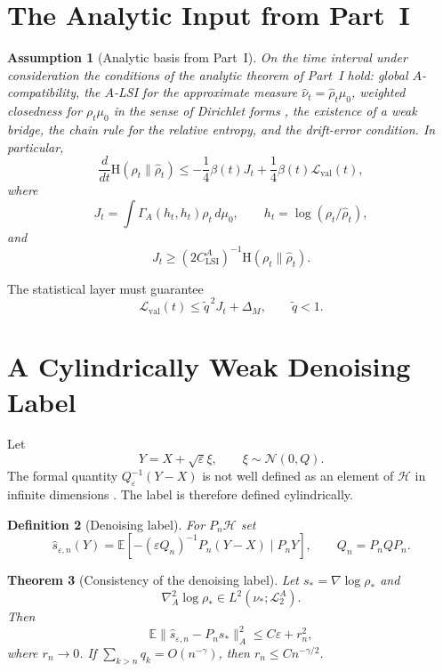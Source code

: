\documentclass{article}
\newtheorem{theorem}{Theorem}[section]
\newtheorem{assumption}[theorem]{Assumption}
\newtheorem{definition}[theorem]{Definition}
\newcommand{\Hh}{\mathcal H}
\newcommand{\LLtwo}{\mathcal L_2}
\newcommand{\E}{\mathbb E}
\newcommand{\Ent}{\mathrm H}
\newcommand{\Eval}{\mathcal L_{\mathrm{val}}}
\begin{document}
\section{The Analytic Input from Part~I}

\begin{assumption}[Analytic basis from Part~I]
\label{ass:part1-base}
On the time interval under consideration the conditions of the analytic theorem
of Part~I hold: global \(A\)-compatibility, the \(A\)-LSI for the approximate
measure \(\hat\nu_t=\hat\rho_t\mu_0\), weighted closedness for \(\rho_t\mu_0\)
in the sense of Dirichlet forms \cite{MaRockner,FukushimaOshimaTakeda},
the existence of a weak bridge, the chain rule for the relative entropy, and the
drift-error condition. In particular,
\[
        \frac{d}{dt}\Ent(\rho_t\|\hat\rho_t)
        \le
        -\frac14\beta(t)J_t+\frac14\beta(t)\Eval(t),
\]
where
\[
        J_t=\int\Gamma_A(h_t,h_t)\rho_t\,d\mu_0,
        \qquad h_t=\log(\rho_t/\hat\rho_t),
\]
and
\[
        J_t\ge (2C_{\mathrm{LSI}}^A)^{-1}\Ent(\rho_t\|\hat\rho_t).
\]
\end{assumption}

The statistical layer must guarantee
\[
        \Eval(t)\le \widetilde q^{\,2}J_t+\Delta_M,
        \qquad \widetilde q<1.
\]

\section{A Cylindrically Weak Denoising Label}

Let
\[
        Y=X+\sqrt{\varepsilon}\xi,\qquad \xi\sim\mathcal N(0,Q).
\]
The formal quantity \(Q_\varepsilon^{-1}(Y-X)\) is not well defined as an element
of \(\Hh\) in infinite dimensions \cite{DaPratoZabczyk,BogachevGaussian}. The label is therefore defined cylindrically.

\begin{definition}[Denoising label]
For \(P_n\Hh\) set
\[
        \widehat s_{\varepsilon,n}(Y)
        =
        \E[-(\varepsilon Q_n)^{-1}P_n(Y-X)\mid P_nY],
        \qquad Q_n=P_nQP_n.
\]
\end{definition}

\begin{theorem}[Consistency of the denoising label]
\label{thm:denoise}
Let \(s_*=\nabla\log\rho_*\) and
\[
        \nabla_A^2\log\rho_*\in L^2(\nu_*;\LLtwo^A).
\]
Then
\[
        \E\|\widehat s_{\varepsilon,n}-P_ns_*\|_{A}^2
        \le C\varepsilon+r_n^2,
\]
where \(r_n\to0\). If \(\sum_{k>n}q_k=O(n^{-\gamma})\), then
\(r_n\le Cn^{-\gamma/2}\).
\end{theorem}
\end{document}
